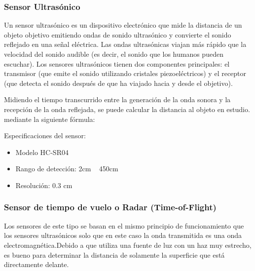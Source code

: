 \subsubsection{Sensor Ultrasónico}
Un sensor ultrasónico es un dispositivo electrónico que mide la distancia de un objeto objetivo emitiendo ondas de sonido ultrasónico y convierte el sonido reflejado en una señal eléctrica. Las ondas ultrasónicas viajan más rápido que la velocidad del sonido audible (es decir, el sonido que los humanos pueden escuchar). Los sensores ultrasónicos tienen dos componentes principales: el transmisor (que emite el sonido utilizando cristales piezoeléctricos) y el receptor (que detecta el sonido después de que ha viajado hacia y desde el objetivo).

Midiendo el tiempo transcurrido entre la generación de la onda sonora y la recepción de la onda reflejada, se puede calcular la distancia al objeto en estudio. mediante la siguiente fórmula:

\insertequation[\label{eqn:velocidad_del_sonido}]{vs = 340 m/s}


Especificaciones del sensor:
\begin{itemize}
    \item Modelo HC-SR04
    \item Rango de detección: 2cm ~ 450cm
    \item Resolución: 0.3 cm
\end{itemize}


\subsubsection{Sensor de tiempo de vuelo o Radar (Time-of-Flight)}
Los sensores de este tipo se basan en el mismo principio de funcionamiento que los sensores ultrasónicos solo que en este caso la onda transmitida es una onda electromagnética.Debido a que utiliza una fuente de luz con un haz muy estrecho, es bueno para determinar la distancia de solamente la superficie que está directamente delante.


